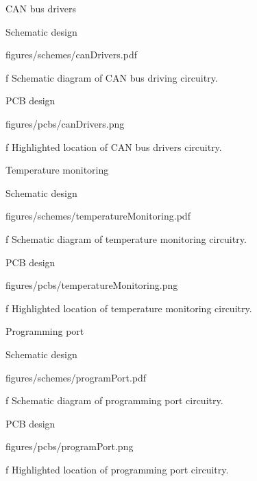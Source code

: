 \sec CAN bus drivers

\secc Schematic design

\midinsert
    \hsize \cinspic figures/schemes/canDrivers.pdf
    \caption/f Schematic diagram of CAN bus driving circuitry.
\endinsert

\secc PCB design

\midinsert
    \hsize \cinspic figures/pcbs/canDrivers.png
    \caption/f Highlighted location of CAN bus drivers circuitry.
\endinsert




\sec Temperature monitoring



\secc Schematic design

\midinsert
    \hsize \cinspic figures/schemes/temperatureMonitoring.pdf
    \caption/f Schematic diagram of temperature monitoring circuitry.
\endinsert

\secc PCB design

\midinsert
    \hsize \cinspic figures/pcbs/temperatureMonitoring.png
    \caption/f Highlighted location of temperature monitoring circuitry.
\endinsert




\sec Programming port

\secc Schematic design

\midinsert
    \hsize \cinspic figures/schemes/programPort.pdf
    \caption/f Schematic diagram of programming port circuitry.
\endinsert

\secc PCB design

\midinsert
    \hsize \cinspic figures/pcbs/programPort.png
    \caption/f Highlighted location of programming port circuitry.
\endinsert
